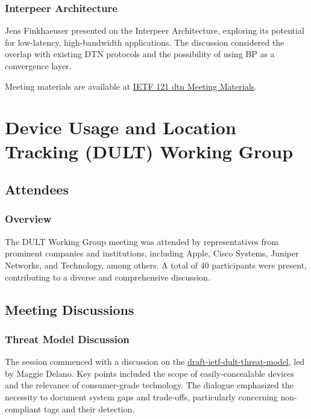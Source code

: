 \documentclass{article}
\begin{document}
\subsubsection{Interpeer Architecture}
Jens Finkhaeuser presented on the Interpeer Architecture, exploring its potential for low-latency, high-bandwidth applications. The discussion considered the overlap with existing DTN protocols and the possibility of using BP as a convergence layer.

Meeting materials are available at \href{https://www.ietf.org/proceedings/121/slides/slides-121-dtn-00.pdf}{IETF 121 dtn Meeting Materials}.



\newpage

\section{Device Usage and Location Tracking (DULT) Working Group}

\subsection{Attendees}

\subsubsection{Overview}

The DULT Working Group meeting was attended by representatives from prominent companies and institutions, including Apple, Cisco Systems, Juniper Networks, and Technology, among others. A total of 40 participants were present, contributing to a diverse and comprehensive discussion.

\subsection{Meeting Discussions}

\subsubsection{Threat Model Discussion}

The session commenced with a discussion on the \href{https://datatracker.ietf.org/doc/html/draft-ietf-dult-threat-model}{draft-ietf-dult-threat-model}, led by Maggie Delano. Key points included the scope of easily-concealable devices and the relevance of consumer-grade technology. The dialogue emphasized the necessity to document system gaps and trade-offs, particularly concerning non-compliant tags and their detection.
\end{document}
